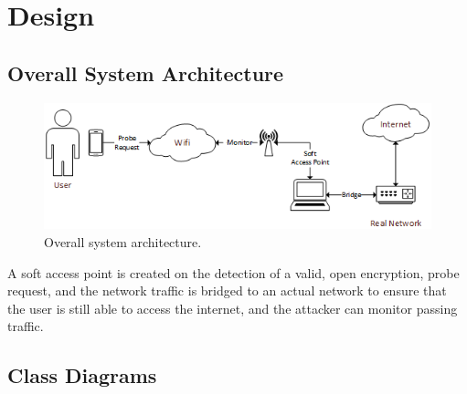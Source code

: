 \section{Design}
\subsection{Overall System Architecture}
\begin{figure}[h!]
\centering\includegraphics{design/figures/overall.png}
\caption{Overall system architecture.}
\end{figure}
A soft access point is created on the detection of a valid, open encryption, probe request, and the network traffic is bridged to an actual network to ensure that the user is still able to access the internet, and the attacker can monitor passing traffic.

\subsection{Class Diagrams}
